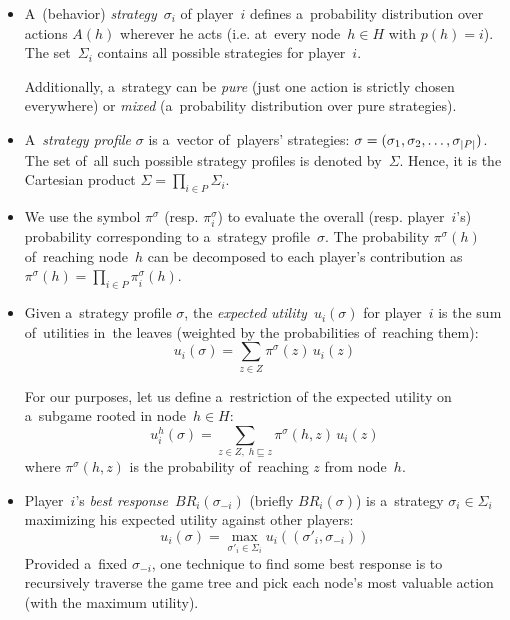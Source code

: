 \begin{itemize}
  \item A~(behavior) \emph{strategy}~$\sigma_i$ of player~$i$ defines a~probability distribution over actions $A(h)$ wherever he acts (i.e. at~every node~$h \in H$ with $p(h) = i$).
    The set~$\Sigma_i$ contains all possible strategies for player~$i$.

  Additionally, a~strategy can be \emph{pure} (just one action is strictly chosen everywhere) or \emph{mixed} (a~probability distribution over pure strategies).

  \item A~\emph{strategy profile} $\sigma$ is a~vector of~players' strategies:
    $\sigma = (\sigma_1, \sigma_2, \ldots, \sigma_ {\left|{P}\right|})$.
    The set of~all such possible strategy profiles is denoted by~$\Sigma$.
    Hence, it is the Cartesian product $\Sigma = \prod_{i \in P} \Sigma_i$.

  \item We use the symbol $\pi^\sigma$ (resp. $\pi_i^\sigma$) to evaluate the overall (resp. player~$i$'s) probability corresponding to a~strategy profile~$\sigma$.
    The probability $\pi^\sigma(h)$ of~reaching node~$h$ can be decomposed to each player's contribution as $\pi ^\sigma(h) = \prod _{i \in P} \pi _i ^\sigma (h)$.

  \item Given a~strategy profile $\sigma$, the \emph{expected utility}~$u_i (\sigma)$ for player~$i$
    is the sum of~utilities in~the leaves (weighted by the probabilities of~reaching them):
    \[ u_i (\sigma) = \sum _{z \in Z} \pi^\sigma\!(z) \,u_i(z)\]

    For our purposes, let us define a~restriction of the expected utility on a~subgame rooted in node~$h\in H$:
    \[ u_i^h(\sigma) = \sum _{z \in Z,\; h \sqsubseteq z} \pi^\sigma\!(h,z) \,u_i(z) \]
    where $\pi^\sigma(h,z)$ is the probability of~reaching $z$ from node~$h$.

  \item Player~$i$'s \emph{best response}~$BR _i (\sigma _{-i})$ (briefly $BR _i (\sigma)$) is a~strategy $\sigma _i \in \Sigma _i$ maximizing his expected utility against other players:
    \[ u_i (\sigma) = \max _{\sigma'_i \in \Sigma_i} u_i ((\sigma'_i, \sigma_{-i})) \]
    Provided a~fixed $\sigma_{-i}$, one technique to find some best response is to recursively traverse the game tree and pick each node's most valuable action (with the maximum utility).
\end{itemize}

